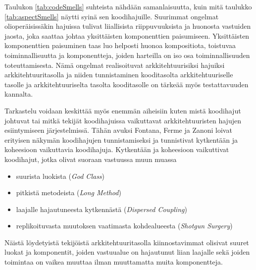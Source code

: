 \documentclass[finnish]{tktltiki2}
\numberwithin{table}{section}
\theoremstyle{definition}
\theoremstyle{remark}
\begin{document}
\noindent
Taulukon \ref{tab:codeSmells} suhteista nähdään samanlaisuutta, kuin mitä taulukko \ref{tab:aspectSmells} näytti syinä sen koodihajuille. Suurimmat ongelmat olioperäisissäkin hajuissa tulivat liiallisista riippuvuuksista ja huonosta vastuiden jaosta, joka saattaa johtaa yksittäisten komponenttien paisumiseen. Yksittäisten komponenttien paisuminen taas luo helposti huonoa kompositiota, toistuvaa toiminnallisuutta ja komponentteja, joiden harteilla on iso osa toiminnallisuuden toteuttamisesta. Nämä ongelmat realisoituvat arkkitehtuurisiksi hajuiksi arkkitehtuuritasolla ja niiden tunnistaminen kooditasolta arkkitehtuuriselle tasolle ja arkkitehtuuriselta tasolta kooditasolle on tärkeää myös testattavuuden kannalta.



Tarkastelu voidaan keskittää myös enemmän aiheisiin kuten mistä koodihajut johtuvat tai mitkä tekijät koodihajuissa vaikuttavat arkkitehtuuristen hajujen esiintymiseen järjestelmissä. Tähän avuksi Fontana, Ferme ja Zanoni loivat erityisen näkymän koodihajujen tunnistamiseksi ja tunnistivat kytkentään ja koheesioon vaikuttavia koodihajuja. Kytkentään ja koheesioon vaikuttivat koodihajut, jotka olivat suoraan vastuussa muun muassa \citep{fontana_towards_2015}


\begin{itemize}
	\item suurista luokista (\textit{God Class})
	\item pitkistä metodeista (\textit{Long Method})
	\item laajalle hajautuneesta kytkennästä (\textit{Dispersed Coupling})
	\item replikoituvasta muutoksen vaatimasta kohdealueesta (\textit{Shotgun Surgery})
\end{itemize}

\noindent
Näistä löydetyistä tekijöistä arkkitehtuuritasolla kiinnostavimmat olisivat suuret luokat ja komponentit, joiden vastuualue on hajautunut liian laajalle sekä joiden toimintaa on vaikea muuttaa ilman muuttamatta muita komponentteja.
\end{document}
